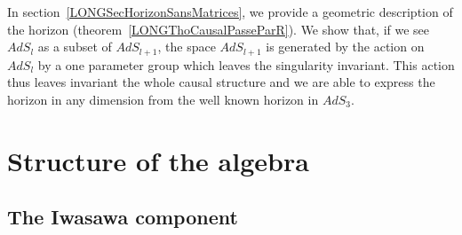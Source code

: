 In section~\ref{LONGSecHorizonSansMatrices}, we provide a geometric description of the horizon (theorem~\ref{LONGThoCausalPasseParR}). We show that, if we see $AdS_l$ as a subset of $AdS_{l+1}$, the space $AdS_{l+1}$ is generated by the action on $AdS_l$ by a one parameter group which leaves the singularity invariant. This action thus leaves invariant the whole causal structure and we are able to express the horizon in any dimension from the well known horizon in $AdS_3$.
%
\section{Structure of the algebra}
%
\label{LONGSecProgressRidMatrices}

%
\subsection{The Iwasawa component}
%

